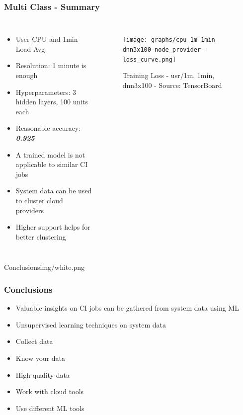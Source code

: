 \documentclass[aspectratio=169,11pt,hyperref={colorlinks=true}]{beamer}
\begin{document}
\begin{frame}
    \frametitle{Multi Class - Summary}
    \begin{columns}
        \begin{itemize}
            \item{User CPU and 1min Load Avg}
            \item{Resolution: 1 minute is enough}
            \item{Hyperparameters: 3 hidden layers, 100 units each}
            \item{Reasonable accuracy: \emph{\textbf{0.925}}}
            \item{A trained model is not applicable to similar CI jobs}
            \item{System data can be used to cluster cloud providers}
            \item{Higher support helps for better clustering}
        \end{itemize}
        \begin{figure}
          \begin{center}
            \texttt{[image: graphs/cpu\_1m-1min-dnn3x100-node\_provider-loss\_curve.png]}
              \caption{Training Loss - usr/1m, 1min, dnn3x100 - Source: TensorBoard}
          \end{center}
        \end{figure}
      \end{columns}
\end{frame}

\begin{sectionpic}
  {Conclusions}{img/white.png}
\end{sectionpic}

\begin{frame}
  \frametitle{Conclusions}
  \begin{itemize}
      \item{Valuable insights on CI jobs can be gathered from system data using ML}
      \item{Unsupervised learning techniques on system data}
      \item{Collect data}
      \item{Know your data}
      \item{High quality data}
      \item{Work with cloud tools}
      \item{Use different ML tools}
    \end{itemize}
\end{frame}
\end{document}
